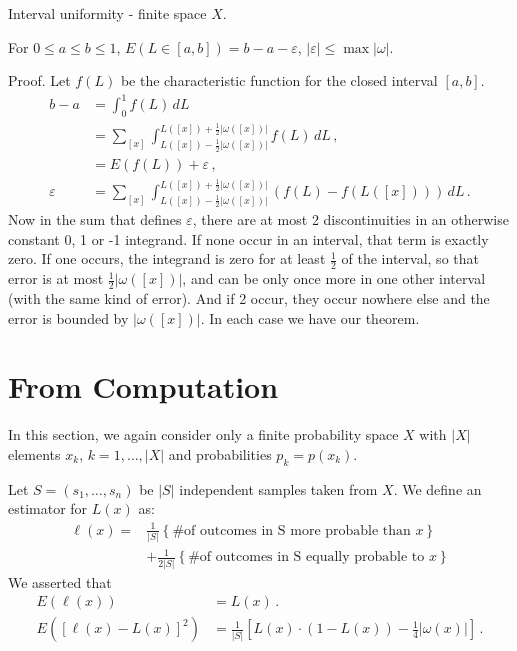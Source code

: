 \begin{theorem}{Interval uniformity - finite space $X$.}

For $0 \leq a \leq b \leq 1$, $E(L \in [a,b])=b-a - \varepsilon$, $|\varepsilon| \leq \max |\omega|$.

Proof.  Let $f(L)$ be the characteristic function for the closed interval $[a,b]$.
\begin{align}
b-a &=\int_0^1 f(L) \, dL  \\
  &= \sum_{[x]} \int_{L([x])-\frac{1}{2}|\omega([x])|}^{L([x])+\frac{1}{2}|\omega([x])|} f(L) \, dL \,, \\
  &= E(f(L)) + \varepsilon \,, \\
\varepsilon &= \sum_{[x]} \int_{L([x])-\frac{1}{2}|\omega([x])|}^{L([x])+\frac{1}{2}|\omega([x])|} (f(L)-f(L([x]))) \, dL \,.
\end{align}
Now in the sum that defines $\varepsilon$, there are at most 2 discontinuities in an otherwise constant 0, 1 or -1 integrand.  If none occur in an interval, that term is exactly zero.  If one occurs, the integrand is zero for at least $\frac{1}{2}$ of the interval, so that error is at most $\frac{1}{2}|\omega([x])|$, and can be only once more in one other interval (with the same kind of error).  And if 2 occur, they occur nowhere else and the error is bounded by $|\omega([x])|$.  In each case we have our theorem.
\end{theorem}

\section{From Computation}
In this section, we again consider only a finite probability space $X$ with $|X|$ elements $x_k$, $k=1,\ldots,|X|$ and probabilities $p_k=p(x_k)$.

Let $S=(s_1, \ldots, s_n)$ be $|S|$ independent samples taken from $X$.  We define an estimator for $L(x)$ as:
\begin{align*}
 \ell(x) = & \frac{1}{|S|} \left\{\text{\# of outcomes in S more probable than $x$}\right\}  \\
 & + \frac{1}{2|S|} \left\{\text{\# of outcomes in S equally probable to $x$}\right\} 
\end{align*}
We asserted that
\begin{align}
\label{eq:elmeanx}
E(\ell(x))&=L(x) \,. \\
\label{eq:elvariancex}
E([\ell(x)-L(x)]^2) &= \frac{1}{|S|} \left[L(x) \cdot (1-L(x)) -\frac{1}{4}|\omega(x)|\right] \,.
\end{align}

